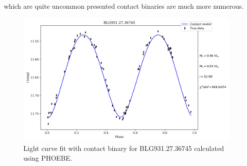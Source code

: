 \documentclass{pracalicmgr}
\begin{document}
which are quite uncommon presented contact binaries are much more numerous.
\begin{figure}
    \centering
    \includegraphics[scale=0.6]{plots/modeling_phoebe_contact_BLG931.27.36745.jpg}
    \caption{Light curve fit with contact binary for BLG931.27.36745 calculated using PHOEBE.}\label{lc_plot}
\end{figure}
\end{document}
